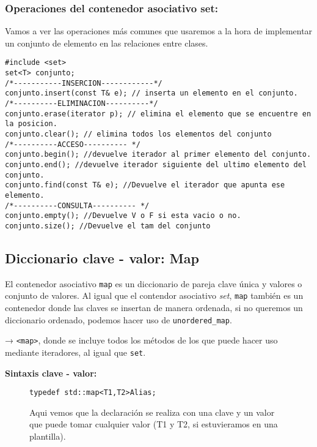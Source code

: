 \subsubsection{Operaciones del contenedor asociativo set:}
Vamos a ver las operaciones más comunes que usaremos a la hora de implementar un conjunto de elemento en las relaciones entre clases.
\begin{center}
  \begin{lstlisting}[frame = single]
#include <set>
set<T> conjunto;
/*-----------INSERCION------------*/
conjunto.insert(const T& e); // inserta un elemento en el conjunto.
/*----------ELIMINACION----------*/
conjunto.erase(iterator p); // elimina el elemento que se encuentre en la posicion.
conjunto.clear(); // elimina todos los elementos del conjunto
/*----------ACCESO---------- */
conjunto.begin(); //devuelve iterador al primer elemento del conjunto.
conjunto.end(); //devuelve iterador siguiente del ultimo elemento del conjunto.
conjunto.find(const T& e); //Devuelve el iterador que apunta ese elemento.
/*----------CONSULTA---------- */
conjunto.empty(); //Devuelve V o F si esta vacio o no.
conjunto.size(); //Devuelve el tam del conjunto
  \end{lstlisting}
\end{center}
\newpage
\subsection{Diccionario clave - valor: Map}
El contenedor asociativo \texttt{map} es un diccionario de pareja clave única y valores o conjunto de valores.
Al igual que el contendor asociativo \textit{set}, \texttt{map} también es un contenedor donde las claves se insertan de manera ordenada,
si no queremos un diccionario ordenado, podemos hacer uso de \texttt{unordered\_map}.\

 → \texttt{<map>}, donde se incluye todos los métodos de los que puede hacer uso mediante iteradores, al igual que \texttt{set}.

\textbf{\large{Sintaxis clave - valor:}}

\begin{figure}[h]
  \begin{center}
    \begin{lstlisting}[frame=single]
                  typedef std::map<T1,T2>Alias;
    \end{lstlisting}
  \end{center}
  Aqui vemos que la declaración se realiza con una clave y un valor que puede tomar cualquier 
  valor (T1 y T2, si estuvieramos en una plantilla).
\end{figure}

